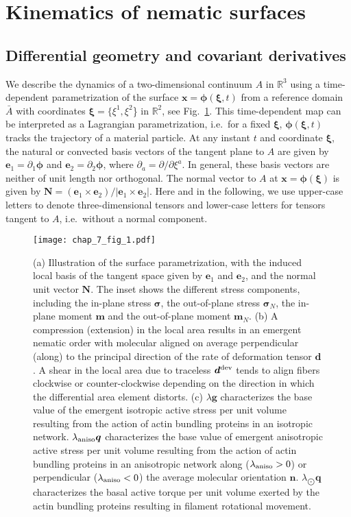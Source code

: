 \section{Kinematics of nematic surfaces} \label{sec4_2_1} 

\subsection{Differential geometry and covariant derivatives}

We describe the dynamics of a two-dimensional continuum $A$ in $\mathbb{R}^3$ using a time-dependent parametrization of the surface $\bm{x}=\bm{\phi}(\bm{\xi},t)$ from a reference domain $\bar{A}$ with coordinates $\bm{\xi}=\{\xi^1, \xi^2$\}  in $\mathbb{R}^2$, see Fig.~\ref{fig_7.1}. This time-dependent map can be interpreted as a Lagrangian parametrization, i.e.~for a fixed $\bm{\xi}$, $\bm{\phi}(\bm{\xi},t)$ tracks the trajectory of a material particle. At any instant $t$ and coordinate $\bm{\xi}$, the natural or convected basis vectors of the tangent plane to $A$ are given by $\bm{e}_1 = \partial_{1} \bm{\phi}$ and $\bm{e}_2 = \partial_{2} \bm{\phi}$, where $\partial_a = \partial / \partial \xi^a$. In general, these basis vectors are neither of unit length nor orthogonal. The  normal vector to $A$ at $\bm{x}=\bm{\phi}(\bm{\xi})$ is given by $\bm{N} = (\bm{e}_1 \times \bm{e}_2)/\left|\bm{e}_1 \times \bm{e}_2 \right|$. Here and in the following, we use upper-case letters to denote three-dimensional tensors and lower-case letters for tensors tangent to $A$, i.e.~without a normal component. 
\begin{figure}[h!]
	\centering
	\texttt{[image: chap\_7\_fig\_1.pdf]}
	\caption{(a) Illustration of the surface parametrization, with the induced local basis of the tangent space given by  $\bm{e}_1$ and $\bm{e}_2$, and the normal unit vector $\bm{N}$. The inset shows the different stress components, including the in-plane stress $\bm{\sigma}$, the out-of-plane stress $\bm{\sigma}_N$, the in-plane moment $\bm{m}$ and the out-of-plane moment $\bm{m}_N$. (b) A compression (extension) in the local area results in an emergent nematic order with molecular aligned on average perpendicular (along) to the principal direction of the rate of deformation tensor $\bm{d}$. A shear in the local area  due to traceless $\bm{d}^{\rm dev}$ tends to align fibers clockwise or counter-clockwise depending on the direction in which the differential area element distorts. (c) $\lambda \bm{g}$ characterizes the base value of the emergent isotropic active stress per unit volume resulting from the action of actin bundling proteins in an isotropic network.  $\lambda_{\rm aniso} \bm{q}$ characterizes the base value of emergent  anisotropic active stress per unit volume resulting from the action of actin bundling proteins in an anisotropic network along ($\lambda_{\rm aniso}>0$) or perpendicular ($\lambda_{\rm aniso}<0$) the average molecular orientation $\bm{n}$.  $\lambda_{\bigodot}\bm{q}$ characterizes the basal active torque per unit volume exerted by the actin bundling proteins resulting in filament rotational movement.}
	\label{fig_7.1}
\end{figure} 
